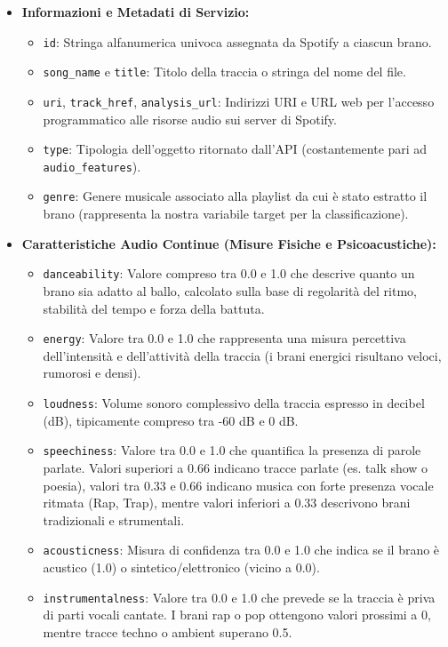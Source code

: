 \documentclass[12pt,a4paper]{article}
\begin{document}
\begin{itemize}
    \item \textbf{Informazioni e Metadati di Servizio:}
    \begin{itemize}
        \item \texttt{id}: Stringa alfanumerica univoca assegnata da Spotify a ciascun brano.
        \item \texttt{song\_name} e \texttt{title}: Titolo della traccia o stringa del nome del file.
        \item \texttt{uri}, \texttt{track\_href}, \texttt{analysis\_url}: Indirizzi URI e URL web per l'accesso programmatico alle risorse audio sui server di Spotify.
        \item \texttt{type}: Tipologia dell'oggetto ritornato dall'API (costantemente pari ad \texttt{audio\_features}).
        \item \texttt{genre}: Genere musicale associato alla playlist da cui è stato estratto il brano (rappresenta la nostra variabile target per la classificazione).
    \end{itemize}
    \item \textbf{Caratteristiche Audio Continue (Misure Fisiche e Psicoacustiche):}
    \begin{itemize}
        \item \texttt{danceability}: Valore compreso tra 0.0 e 1.0 che descrive quanto un brano sia adatto al ballo, calcolato sulla base di regolarità del ritmo, stabilità del tempo e forza della battuta.
        \item \texttt{energy}: Valore tra 0.0 e 1.0 che rappresenta una misura percettiva dell'intensità e dell'attività della traccia (i brani energici risultano veloci, rumorosi e densi).
        \item \texttt{loudness}: Volume sonoro complessivo della traccia espresso in decibel (dB), tipicamente compreso tra -60 dB e 0 dB.
        \item \texttt{speechiness}: Valore tra 0.0 e 1.0 che quantifica la presenza di parole parlate. Valori superiori a 0.66 indicano tracce parlate (es. talk show o poesia), valori tra 0.33 e 0.66 indicano musica con forte presenza vocale ritmata (Rap, Trap), mentre valori inferiori a 0.33 descrivono brani tradizionali e strumentali.
        \item \texttt{acousticness}: Misura di confidenza tra 0.0 e 1.0 che indica se il brano è acustico (1.0) o sintetico/elettronico (vicino a 0.0).
        \item \texttt{instrumentalness}: Valore tra 0.0 e 1.0 che prevede se la traccia è priva di parti vocali cantate. I brani rap o pop ottengono valori prossimi a 0, mentre tracce techno o ambient superano 0.5.

\end{itemize}
\end{itemize}
\end{document}
